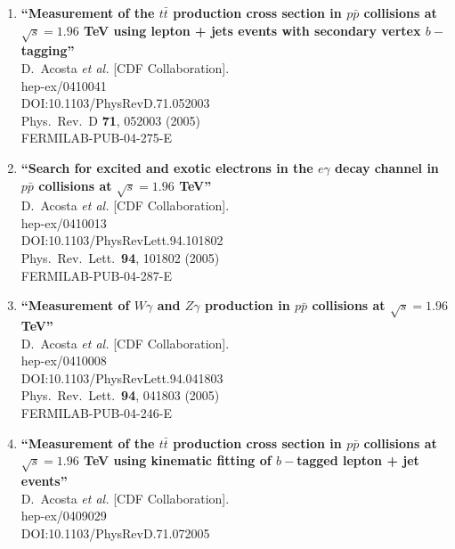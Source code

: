 \documentclass{article}
\begin{document}
\begin{enumerate}
\item%
{\bf ``Measurement of the $t\bar{t}$ production cross section in $p\bar{p}$ collisions at $\sqrt{s} = 1.96$ TeV using lepton + jets events with secondary vertex $b-$tagging''}
  \\{}D.~Acosta {\it et al.} [CDF Collaboration].
  \\{}hep-ex/0410041
  \\{}DOI:10.1103/PhysRevD.71.052003
  \\{}Phys.\ Rev.\ D {\bf 71}, 052003 (2005)
  \\{}FERMILAB-PUB-04-275-E
\item%
{\bf ``Search for excited and exotic electrons in the $e \gamma$ decay channel in $p \bar{p}$ collisions at $\sqrt{s} = 1.96$ TeV''}
  \\{}D.~Acosta {\it et al.} [CDF Collaboration].
  \\{}hep-ex/0410013
  \\{}DOI:10.1103/PhysRevLett.94.101802
  \\{}Phys.\ Rev.\ Lett.\  {\bf 94}, 101802 (2005)
  \\{}FERMILAB-PUB-04-287-E
\item%
{\bf ``Measurement of $W \gamma$ and $Z \gamma$ production in $p\bar{p}$ collisions at $\sqrt{s} = 1.96$ TeV''}
  \\{}D.~Acosta {\it et al.} [CDF Collaboration].
  \\{}hep-ex/0410008
  \\{}DOI:10.1103/PhysRevLett.94.041803
  \\{}Phys.\ Rev.\ Lett.\  {\bf 94}, 041803 (2005)
  \\{}FERMILAB-PUB-04-246-E
\item%
{\bf ``Measurement of the $t\bar{t}$ production cross section in $p\bar{p}$ collisions at $\sqrt{s} = 1.96$ TeV using kinematic fitting of $b-$tagged lepton + jet events''}
  \\{}D.~Acosta {\it et al.} [CDF Collaboration].
  \\{}hep-ex/0409029
  \\{}DOI:10.1103/PhysRevD.71.072005

\end{enumerate}
\end{document}
